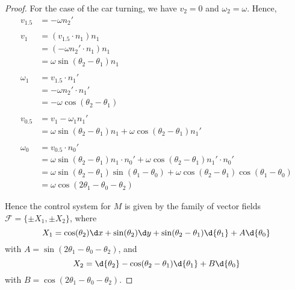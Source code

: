 \documentclass{article}
\begin{document}
\begin{proof}
For the case of the car turning, we have $v_2 = 0$ and $\omega_2 = \omega$. Hence,
\begin{align*}
v_{1.5} & =  -\omega n_2'
\\
\\ v_1 & =  (v_{1.5} \cdot n_1) n_1
\\ & =  (-\omega n_2' \cdot n_1) n_1
\\ & = \omega \sin(\theta_2 - \theta_1) n_1
\\
\\ \omega_1 & =  v_{1.5} \cdot n_1'
\\ & = - \omega n_2' \cdot n_1'
\\ & =  -\omega \cos(\theta_2 - \theta_1)
\\
\\ v_{0.5} & =  v_1  - \omega_1 n_1'
\\ & = \omega \sin(\theta_2 - \theta_1) n_1 + \omega \cos(\theta_2 - \theta_1) n_1'
\\
\\  \omega_0 & = v_{0.5} \cdot n_0'
\\ & = \omega \sin(\theta_2 - \theta_1) n_1 \cdot n_0' + \omega \cos(\theta_2 - \theta_1) n_1' \cdot n_0'
\\ & = \omega \sin(\theta_2 - \theta_1) \sin(\theta_1 - \theta_0) + \omega \cos(\theta_2 - \theta_1) \cos(\theta_1 - \theta_0)
\\ & = \omega \cos(2 \theta_1 - \theta_0 - \theta_2)
\end{align*}

Hence the control system for $M$ is given by the family of vector fields $\mathcal F = \{\pm X_1, \pm X_2\}$, where
$$X_1 = \cos(\theta_2) \d x  + \sin(\theta_2) \d y  + \sin(\theta_2 - \theta_1)  \d {\theta_1} + A \d {\theta_0}$$
with $A = \sin(2 \theta_1 - \theta_0 - \theta_2)$,
and
$$X_2 =  \d {\theta_2} - \cos(\theta_2 - \theta_1) \d {\theta_1} + B \d {\theta_0}$$
with $B = \cos(2 \theta_1 - \theta_0 - \theta_2)$.
\end{proof}
\end{document}
